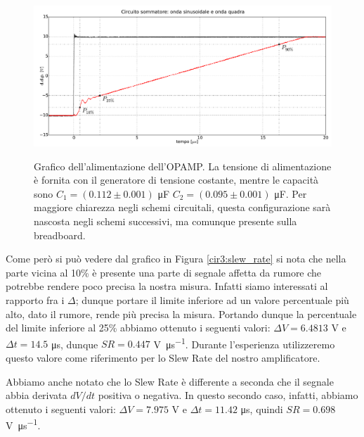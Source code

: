 \begin{figure}[ht]
 \centering
   {\includegraphics[width=16.5cm]{../E03/latex/sr_up.pdf}}
 \caption{Grafico dell'alimentazione dell'OPAMP. La tensione di alimentazione è fornita con il generatore di tensione costante, mentre le capacità sono $C_1=(0.112 \pm 0.001)$ \si{\micro\farad} $C_2=(0.095\pm0.001)$ \si{\micro\farad}. Per maggiore chiarezza negli schemi circuitali, questa configurazione sarà nascosta negli schemi successivi, ma comunque presente sulla breadboard.}
 \label{gr3:slew_rate}
\end{figure}

Come però si può vedere dal grafico in Figura \ref{cir3:slew_rate} si nota che nella parte vicina al 10\% è presente una parte di segnale affetta da rumore che potrebbe rendere poco precisa la nostra misura. Infatti siamo interessati al rapporto fra i $\Delta$; dunque portare il limite inferiore ad un valore percentuale più alto, dato il rumore, rende più precisa la misura. Portando dunque la percentuale del limite inferiore al 25\% abbiamo ottenuto i seguenti valori: $\Delta V = 6.4813$ \si{\volt} e $\Delta t = 14.5$ \si{\micro\second}, dunque $SR = 0.447$ \si{\volt\per\micro\second}. Durante l'esperienza utilizzeremo questo valore come riferimento per lo Slew Rate del nostro amplificatore.

Abbiamo anche notato che lo Slew Rate è differente a seconda che il segnale abbia derivata $dV/dt$ positiva o negativa. In questo secondo caso, infatti, abbiamo ottenuto i seguenti valori: $\Delta V = 7.975$ \si{\volt} e $\Delta t = 11.42$ \si{\micro\second}, quindi $SR = 0.698$ \si{\volt\per\micro\second}.